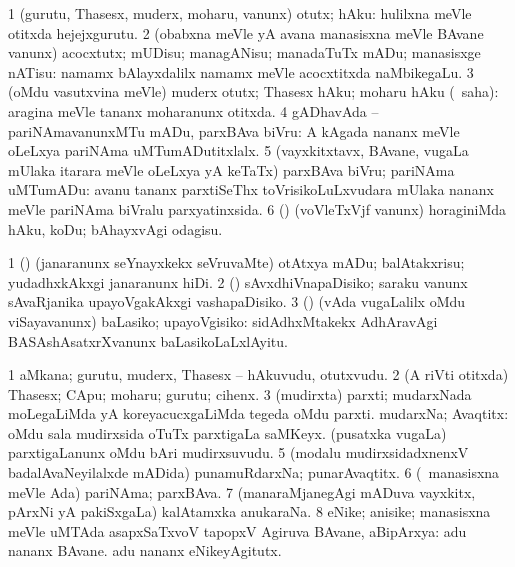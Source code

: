 \bentry
{}
\gl{\sakirx}
\bmng
\bnum
\num{1} (gurutu, Thasesx, muderx, moharu, \mo vanunx) otutx; hAku:  hulilxna meVle otitxda hejejxgurutu. 
\num{2} (obabxna meVle yA avana manasisxna meVle BAvane \mo vanunx) acocxtutx; mUDisu; managANisu; manadaTuTx mADu; manasisxge nATisu:  namamx bAlayxdalilx namamx meVle acocxtitxda naMbikegaLu. 
\num{3} (oMdu vasutxvina meVle) muderx otutx; Thasesx hAku; moharu hAku (\rUpa\ saha):  aragina meVle tananx moharanunx otitxda. 
\num{4} gADhavAda -- pariNAmavanunxMTu mADu, parxBAva biVru:  A kAgada nananx meVle oLeLxya pariNAma uMTumADutitxlalx. 
\num{5} (vayxkitxtavx, BAvane, \mo vugaLa mUlaka itarara meVle oLeLxya yA keTaTx) parxBAva biVru; pariNAma uMTumADu:  avanu tananx parxtiSeThx toVrisikoLuLxvudara mUlaka nananx meVle pariNAma biVralu parxyatinxsida. 
\num{6} (\viduyx) (voVleTxVjf \mo vanunx) horaginiMda hAku, koDu; bAhayxvAgi odagisu. 
\enum
\emng
\eentry

\bentry
{}
\gl{\sakirx}
\bmng
\bnum
\num{1} (\ca) (janaranunx seYnayxkekx seVruvaMte) otAtxya mADu; balAtakxrisu; yudadhxkAkxgi janaranunx hiDi. 
\num{2} (\ca) sAvxdhiVnapaDisiko; saraku \mo vanunx sAvaRjanika upayoVgakAkxgi vashapaDisiko. 
\num{3} (\pArxparx) (vAda \mo vugaLalilx oMdu viSayavanunx) baLasiko; upayoVgisiko:  sidAdhxMtakekx AdhAravAgi BASAshAsatxrXvanunx baLasikoLaLxlAyitu. 
\enum
\emng
\eentry

\bentry
{}
\gl{\nA}
\bmng
\bnum
\num{1} aMkana; gurutu, muderx, Thasesx -- hAkuvudu, otutxvudu. 
\num{2} (A riVti otitxda) Thasesx; CApu; moharu; gurutu; cihenx. 
\num{3} (mudirxta) parxti; mudarxNada moLegaLiMda yA koreyacucxgaLiMda tegeda oMdu parxti. 
 mudarxNa; Avaqtitx: 
\banum
{} oMdu sala mudirxsida oTuTx parxtigaLa saMKeyx. 
 (pusatxka \mo vugaLa) parxtigaLanunx oMdu bAri mudirxsuvudu. 
\eanum
\numie
\num{5} (modalu mudirxsidadxnenxV badalAvaNeyilalxde mADida) punamuRdarxNa; punarAvaqtitx. 
\num{6} (\kanmu\ manasisxna meVle Ada) pariNAma; parxBAva. 
\num{7} (manaraMjanegAgi mADuva vayxkitx, pArxNi yA pakiSxgaLa) kalAtamxka anukaraNa. 
\num{8} eNike; anisike; manasisxna meVle uMTAda asapxSaTxvoV tapopxV Agiruva BAvane, aBipArxya:  adu nananx BAvane.  adu nananx eNikeyAgitutx. 
\enum
\emng
\eentry

